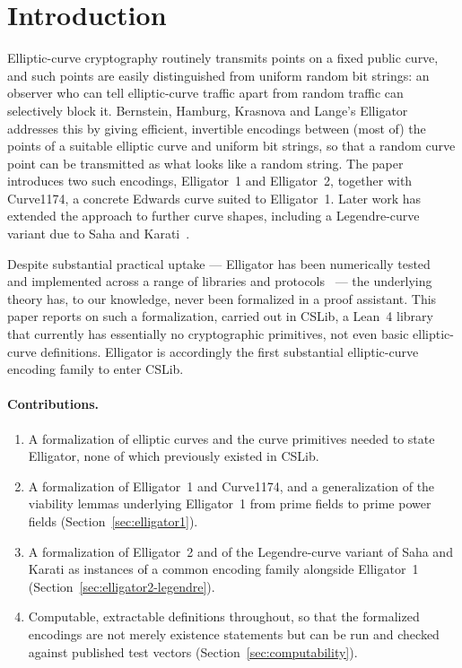 \section{Introduction}
\label{sec:introduction}

Elliptic-curve cryptography routinely transmits points on a fixed
public curve, and such points are easily distinguished from uniform
random bit strings: an observer who can tell elliptic-curve traffic
apart from random traffic can selectively block it. Bernstein,
Hamburg, Krasnova and Lange's Elligator~\cite{bernstein2013a}
addresses this by giving efficient, invertible encodings between
(most of) the points of a suitable elliptic curve and uniform bit
strings, so that a random curve point can be transmitted as what
looks like a random string. The paper introduces two such encodings,
Elligator~1 and Elligator~2, together with Curve1174, a concrete
Edwards curve suited to Elligator~1. Later work has extended the
approach to further curve shapes, including a Legendre-curve variant
due to Saha and Karati~\cite{gourab2026a}.

Despite substantial practical uptake --- Elligator has been
numerically tested~\cite{elligatorcryptotests} and implemented
across a range of libraries and protocols~\cite{elligatororg} --- the
underlying theory has, to our knowledge, never been formalized in a
proof assistant. This paper reports on such a formalization, carried
out in CSLib, a Lean~4 library that currently has essentially no
cryptographic primitives, not even basic elliptic-curve definitions.
Elligator is accordingly the first substantial elliptic-curve
encoding family to enter CSLib.

\paragraph{Contributions.}
\begin{enumerate}
  \item A formalization of elliptic curves and the curve primitives
    needed to state Elligator, none of which previously existed in
    CSLib.
  \item A formalization of Elligator~1 and Curve1174, and a
    generalization of the viability lemmas underlying Elligator~1
    from prime fields to prime power fields (Section~\ref{sec:elligator1}).
  \item A formalization of Elligator~2 and of the Legendre-curve
    variant of Saha and Karati as instances of a common encoding
    family alongside Elligator~1 (Section~\ref{sec:elligator2-legendre}).
  \item Computable, extractable definitions throughout, so that the
    formalized encodings are not merely existence statements but can
    be run and checked against published test
    vectors (Section~\ref{sec:computability}).
\end{enumerate}

